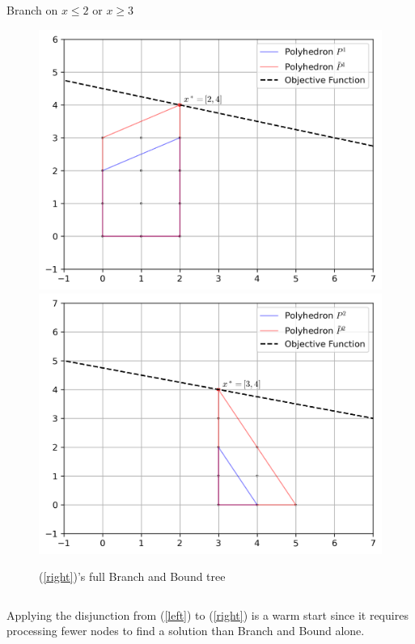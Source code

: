 \documentclass{beamer}
\begin{document}
\begin{frame}[t]
\begin{columns}[T]
\begin{column}{0.7\textwidth}
\begin{figure}[h]
{					}
					\label{p:root_prime}
				\end{figure}
				\vspace{-.25cm}
				\centering
				Branch on $ x \leq 2 $ or $ x \geq 3 $
				\vspace{-.25cm}
				\begin{figure}[]
					\centering
					\includegraphics[width=.45\textwidth]{P1_prime.png}
					\hfill
					\includegraphics[width=.45\textwidth]{P2_prime.png}
					\captionsetup{font=footnotesize,labelfont=footnotesize}
					\caption{(\ref{right})'s full Branch and Bound tree}
					\label{p:full_after}
				\end{figure}
			\end{column}
		\end{columns}
		\vspace{-.35cm}
		\begin{block}{}
			Applying the disjunction from (\ref{left}) to (\ref{right}) is a warm start since it requires processing fewer nodes to find a solution than Branch and Bound alone.
		\end{block}
		\normalsize
	\end{frame}
\end{document}
